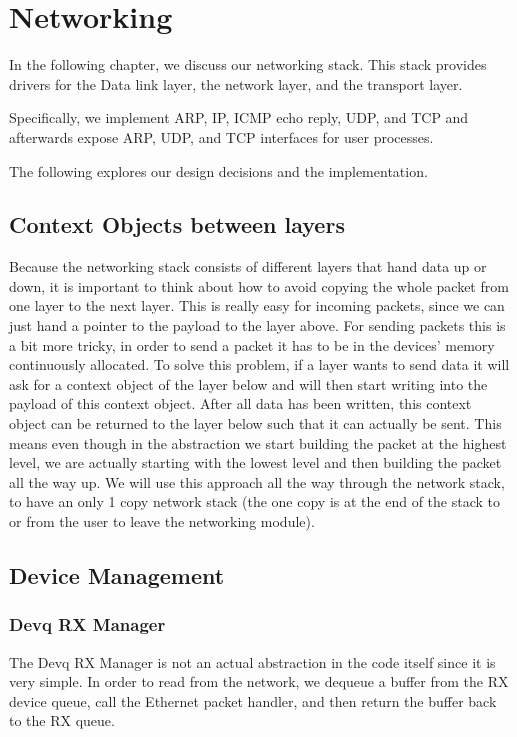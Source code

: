 \chapter{Networking}
In the following chapter, we discuss our networking stack. This stack provides drivers for the Data link layer, the network layer, and the transport layer.

Specifically, we implement ARP, IP, ICMP echo reply, UDP, and TCP and afterwards expose ARP, UDP, and TCP interfaces for user processes.

The following explores our design decisions and the implementation.

\section{Context Objects between layers}

Because the networking stack consists of different layers that hand data up or down, it is important to think about how to avoid copying the whole packet from one layer to the next layer. 
This is really easy for incoming packets, since we can just hand a pointer to the payload to the layer above. 
For sending packets this is a bit more tricky, in order to send a packet it has to be in the devices' memory continuously allocated. To solve this problem, if a layer wants to send data it will ask for a context object of the layer below and will then start writing into the payload of this context object. After all data has been written, this context object can be returned to the layer below such that it can actually be sent. This means even though in the abstraction we start building the packet at the highest level, we are actually starting with the lowest level and then building the packet all the way up.
We will use this approach all the way through the network stack, to have an only 1 copy network stack (the one copy is at the end of the stack to or from the user to leave the networking module).

\section{Device Management}

\subsection{Devq RX Manager}

The Devq RX Manager is not an actual abstraction in the code itself since it is very simple. In order to read from the network, we dequeue a buffer from the RX device queue, call the Ethernet packet handler, and then return the buffer back to the RX queue.  

